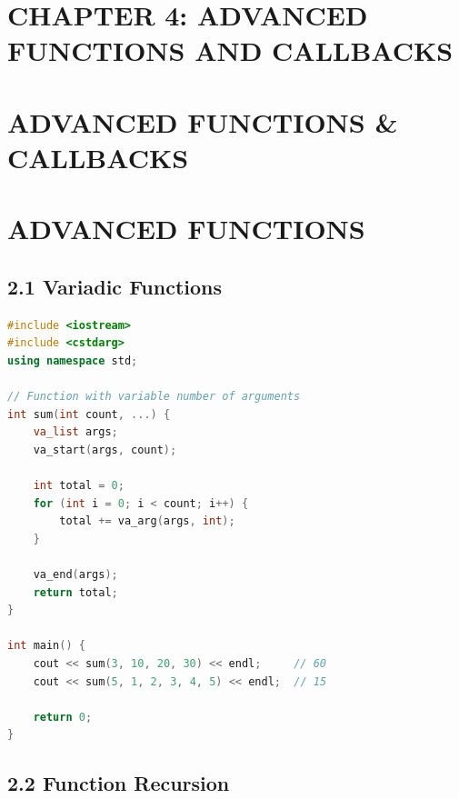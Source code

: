 \hypertarget{chapter-4-advanced-functions-and-callbacks}{%
\section{CHAPTER 4: ADVANCED FUNCTIONS AND
CALLBACKS}\label{chapter-4-advanced-functions-and-callbacks}}

\hypertarget{advanced-functions-callbacks}{%
\section{ADVANCED FUNCTIONS \&
CALLBACKS}\label{advanced-functions-callbacks}}

\hypertarget{advanced-functions}{%
\section{ADVANCED FUNCTIONS}\label{advanced-functions}}

\hypertarget{variadic-functions}{%
\subsection{2.1 Variadic Functions}\label{variadic-functions}}

\begin{lstlisting}[language={C++}]
#include <iostream>
#include <cstdarg>
using namespace std;

// Function with variable number of arguments
int sum(int count, ...) {
    va_list args;
    va_start(args, count);

    int total = 0;
    for (int i = 0; i < count; i++) {
        total += va_arg(args, int);
    }

    va_end(args);
    return total;
}

int main() {
    cout << sum(3, 10, 20, 30) << endl;     // 60
    cout << sum(5, 1, 2, 3, 4, 5) << endl;  // 15

    return 0;
}
\end{lstlisting}

\hypertarget{function-recursion}{%
\subsection{2.2 Function Recursion}\label{function-recursion}}

